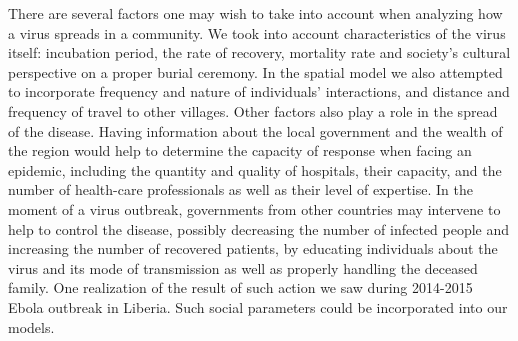 There are several factors one may wish to take into account when analyzing how a virus spreads in a community. We took into account characteristics of the virus itself: incubation period, the rate of recovery, mortality rate and society's cultural perspective on a proper burial ceremony. In the spatial model we also attempted to incorporate frequency and nature of individuals' interactions, and distance and frequency of travel to other villages. Other factors also play a role in the spread of the disease. Having information about the local government and the wealth of the region would help to determine the capacity of response when facing an epidemic, including the quantity and quality of hospitals, their capacity, and the number of health-care professionals as well as their level of expertise. In the moment of a virus outbreak, governments from other countries may intervene to help to control the disease, possibly decreasing the number of infected people and increasing the number of recovered patients, by educating individuals about the virus and its mode of transmission as well as properly handling the deceased family. One realization of the result of such action we saw during 2014-2015 Ebola outbreak in Liberia. Such social parameters could be incorporated into our models.